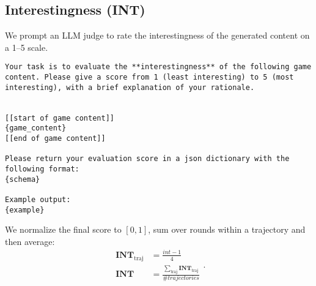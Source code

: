 \subsection{Interestingness (INT)}
We prompt an LLM judge to rate the interestingness of the generated content on a 1--5 scale.
\begin{center}
\begin{minipage}{0.95\textwidth}
\begin{lstlisting}[language=plaintext, frame=none, numbers=none]
Your task is to evaluate the **interestingness** of the following game content. Please give a score from 1 (least interesting) to 5 (most interesting), with a brief explanation of your rationale.


[[start of game content]]
{game_content}
[[end of game content]]

Please return your evaluation score in a json dictionary with the following format:
{schema}

Example output:
{example}
\end{lstlisting}
\end{minipage}
\end{center}
We normalize the final score to \([0, 1]\), sum over rounds within a trajectory and then average:
\begin{equation}
\begin{aligned}
    \textbf{INT}_{\text{traj}} &= \frac{int-1}{4}\\
    \textbf{INT} &= \frac{\sum_{\text{traj}} \textbf{INT}_\text{traj}}{\# trajectories}
\end{aligned}.
\end{equation}
